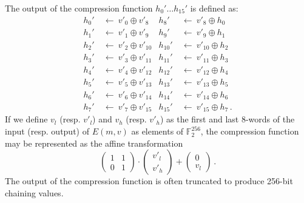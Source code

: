 \documentclass[11pt,notitlepage,a4paper]{article}
\begin{document}
The output of the compression function $h_{0}' \ldots h_{15}'$ is
defined as:
\begin{align*}
h_{0}'  \ & \leftarrow \ v'_{0} \oplus  v'_{8} &
h_{8}'  \ & \leftarrow \ v'_{8} \oplus  h_{0} \\
h_{1}'  \ & \leftarrow \ v'_{1} \oplus  v'_{9} &
h_{9}'  \ & \leftarrow \ v'_{9} \oplus  h_{1} \\
h_{2}'  \ & \leftarrow \ v'_{2} \oplus  v'_{10} &
h_{10}' \ & \leftarrow \ v'_{10} \oplus  h_{2} \\
h_{3}'  \ & \leftarrow \ v'_{3} \oplus  v'_{11} &
h_{11}' \ & \leftarrow \ v'_{11} \oplus  h_{3} \\
h_{4}'  \ & \leftarrow \ v'_{4} \oplus  v'_{12} &
h_{12}' \ & \leftarrow \ v'_{12} \oplus  h_{4} \\
h_{5}'  \ & \leftarrow \ v'_{5} \oplus  v'_{13} &
h_{13}' \ & \leftarrow \ v'_{13} \oplus  h_{5} \\
h_{6}'  \ & \leftarrow \ v'_{6} \oplus  v'_{14} &
h_{14}' \ & \leftarrow \ v'_{14} \oplus  h_{6} \\
h_{7}'  \ & \leftarrow \ v'_{7} \oplus  v'_{15} &
h_{15}' \ & \leftarrow \ v'_{15} \oplus  h_{7}\,.
\end{align*}
If we define $v_l$ (resp. $v'_l$) and $v_h$ (resp. $v'_h$) as the first and last 8-words of the input (resp. output) of $E(m, v)$ as elements of $\mathbb{F}_2^{256}$, the compression function may be represented as the affine transformation
\[
  \begin{pmatrix}
    1 & 1 \\
    0 & 1
  \end{pmatrix}\cdot%
  \begin{pmatrix}
  v'_l \\ v'_h
  \end{pmatrix} + 
  \begin{pmatrix}
   0 \\ v_l
  \end{pmatrix}\,.
\]
The output of the compression function is often truncated to produce 256-bit chaining values. %
\end{document}
